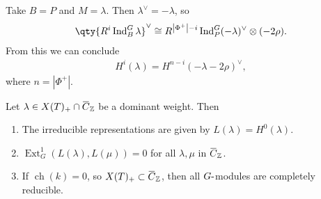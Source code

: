 \begin{example}

Take \(B = P\) and \(M = \lambda\). Then \(\lambda ^\vee= -\lambda\), so
\begin{align*}  
\qty{ R^i \operatorname{Ind}_B^G \lambda }^\vee\cong R^{{\left\lvert {\Phi^+} \right\rvert} -i} \operatorname{Ind}_P^G (- \lambda) ^\vee\otimes(-2\rho)
.\end{align*}
From this we can conclude
\begin{align*}  
H^i(\lambda) = H^{n-i} (-\lambda - 2\rho)^\vee
,\end{align*}
where \(n = {\left\lvert {\Phi^+} \right\rvert}\).

\end{example}

\begin{corollary}[?]

Let
\(\lambda \in X(T)_+ \cap\mkern 1.5mu\overline{\mkern-1.5muC\mkern-1.5mu}\mkern 1.5mu_{\mathbb{Z}}\)
be a dominant weight. Then

\begin{enumerate}
\def\labelenumi{\alph{enumi}.}
\item
  The irreducible representations are given by
  \(L(\lambda) = H^0(\lambda)\).
\item
  \(\operatorname{Ext}_G^1(L(\lambda), L(\mu)) = 0\) for all
  \(\lambda, \mu\) in
  \(\mkern 1.5mu\overline{\mkern-1.5muC\mkern-1.5mu}\mkern 1.5mu_{\mathbb{Z}}\).
\item
  If \(\operatorname{ch}(k) = 0\), so
  \(X(T)_+ \subset \mkern 1.5mu\overline{\mkern-1.5muC\mkern-1.5mu}\mkern 1.5mu_{\mathbb{Z}}\),
  then all \(G{\hbox{-}}\)modules are completely reducible.
\end{enumerate}

\end{corollary}

